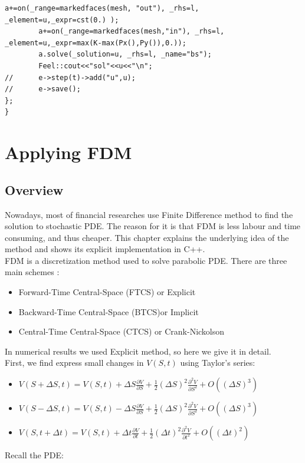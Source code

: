 \documentclass[a4paper]{report}
\begin{document}
\begin{itemize}
\begin{itemize}
\begin{lstlisting}[backgroundcolor = \color{light-gray}]
        a+=on(_range=markedfaces(mesh, "out"), _rhs=l, _element=u,_expr=cst(0.) );
        a+=on(_range=markedfaces(mesh,"in"), _rhs=l, _element=u,_expr=max(K-max(Px(),Py()),0.));
        a.solve(_solution=u, _rhs=l, _name="bs");
        Feel::cout<<"sol"<<u<<"\n";
//      e->step(t)->add("u",u);
//      e->save();
};
}
\end{lstlisting}


\chapter{Applying FDM}
\section{Overview}
Nowadays, most of financial researches use Finite Difference method to find the solution to stochastic PDE. The reason for it is that FDM is less labour and time consuming, and thus cheaper. This chapter explains the underlying idea of the method and shows its explicit implementation in C++.    \\
FDM is a discretization method used to solve parabolic PDE. There are three main schemes : 
\begin{itemize}
\item Forward-Time Central-Space (FTCS) or Explicit
\item Backward-Time Central-Space (BTCS)or Implicit
\item Central-Time Central-Space (CTCS) or Crank-Nickolson 
\end{itemize}
In numerical results we used Explicit method, so here we give it in detail.  \\
First, we find express small changes in $V(S,t)$ using Taylor's series:
\begin{itemize}[label=$\bullet$]
\item $V(S+\Delta S, t) = V(S,t)+\Delta S \frac{\partial V}{\partial S}+\frac{1}{2}(\Delta S)^2 \frac{\partial^2 V}{\partial S^2} + O((\Delta S)^3)  $
\item $V(S-\Delta S, t) = V(S,t)-\Delta S \frac{\partial V}{\partial S}+\frac{1}{2}(\Delta S)^2 \frac{\partial^2 V}{\partial S^2} + O((\Delta S)^3)  $
\item $V(S, t + \Delta t) = V(S,t)+\Delta t \frac{\partial V}{\partial t}+\frac{1}{2}(\Delta t)^2 \frac{\partial^2 V}{\partial t^2} + O((\Delta t)^2)  $
\end{itemize} 
Recall the PDE:


\end{itemize}
\end{itemize}
\end{document}
